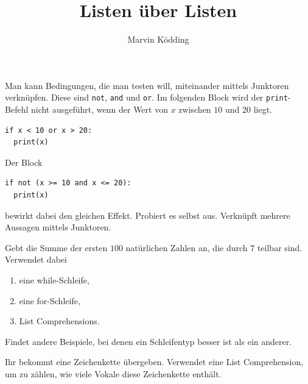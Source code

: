 \documentclass[a4paper, 12pt]{mksheetphhd}
\title{Listen über Listen}
\author{Marvin Ködding}
\begin{document}
	\printtitle
	
	\vspace*{1cm}
	
	\begin{aufgabe}
		Man kann Bedingungen, die man testen will, miteinander mittels Junktoren verknüpfen. Diese sind \verb*|not|, \verb*|and| und \verb*|or|. Im folgenden Block wird der \verb*|print|-Befehl nicht ausgeführt, wenn der Wert von $x$ zwischen $10$ und $20$ liegt.
		
		\begin{verbatim}
if x < 10 or x > 20:
  print(x)
		\end{verbatim}
		
		Der Block
		
		\begin{verbatim}
if not (x >= 10 and x <= 20):
  print(x)
		\end{verbatim}
		
		bewirkt dabei den gleichen Effekt. Probiert es selbst aus. Verknüpft mehrere Aussagen mittels Junktoren.
	\end{aufgabe}
	

	
	\begin{aufgabe}
		Gebt die Summe der ersten $100$ natürlichen Zahlen an, die durch $7$ teilbar sind. Verwendet dabei
		\begin{enumerate}
			\item eine while-Schleife,
			\item eine for-Schleife,
			\item List Comprehensions.
		\end{enumerate}
		Findet andere Beispiele, bei denen ein Schleifentyp besser ist als ein anderer.
	\end{aufgabe}
	
	\begin{aufgabe}
		Ihr bekommt eine Zeichenkette übergeben. Verwendet eine List Comprehension, um zu zählen, wie viele Vokale diese Zeichenkette enthält.
	\end{aufgabe}
	
\end{document}
